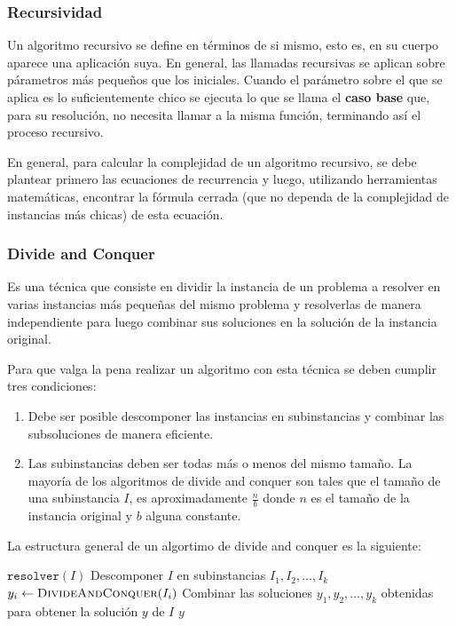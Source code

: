 \subsubsection{Recursividad}
Un algoritmo recursivo se define en términos de si mismo, esto es, en su cuerpo aparece una aplicación suya. En general, las llamadas recursivas se aplican sobre párametros más pequeños que los iniciales. Cuando el parámetro sobre el que se aplica es lo suficientemente chico se ejecuta lo que se llama el \textbf{caso base} que, para su resolución, no necesita llamar a la misma función, terminando así el proceso recursivo.

En general, para calcular la complejidad de un algoritmo recursivo, se debe plantear primero las ecuaciones de recurrencia y luego, utilizando herramientas matemáticas, encontrar la fórmula cerrada (que no dependa de la complejidad de instancias más chicas) de esta ecuación.

\subsubsection{Divide and Conquer}
Es una técnica que consiste en dividir la instancia de un problema a resolver en varias instancias más pequeñas del mismo problema y resolverlas de manera independiente para luego combinar sus soluciones en la solución de la instancia original. 

Para que valga la pena realizar un algoritmo con esta técnica se deben cumplir tres condiciones:

\begin{enumerate}
	\item Debe ser posible descomponer las instancias en subinstancias y combinar las subsoluciones de manera eficiente.
	\item Las subinstancias deben ser todas más o menos del mismo tamaño. La mayoría de los algoritmos de divide and conquer son tales que el tamaño de una subinstancia \(I\), es aproximadamente \(\frac{n}{b}\) donde \(n\) es el tamaño de la instancia original y \(b\) alguna constante.
\end{enumerate}

La estructura general de un algortimo de divide and conquer es la siguiente:

\begin{algorithmic}
		\Return \(\texttt{resolver}(I)\)
	\Else
		\State Descomponer \(I\) en subinstancias \(I_1, I_2,\dots, I_k\)
			\State \(y_i \gets \Call{DivideAndConquer}{I_i}\)
		\EndFor
		\State Combinar las soluciones \(y_1, y_2,\dots, y_k\) obtenidas para obtener la solución \(y\) de \(I\)
		\State\Return \(y\)
	\EndIf

	\EndFunction
\end{algorithmic}

